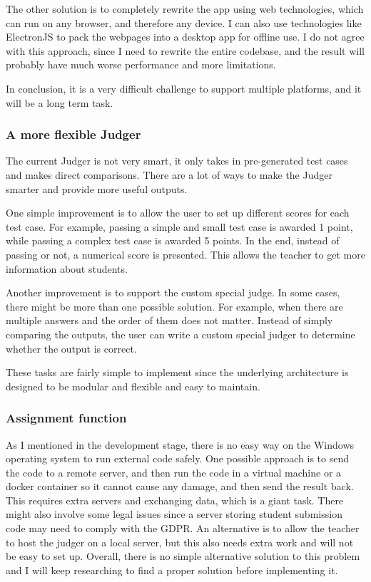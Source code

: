 \documentclass[report.tex]{subfiles}
\begin{document}
The other solution is to completely rewrite the app using web technologies, which can run on any browser, and therefore any device. I can also use technologies like ElectronJS\cite{electron} to pack the webpages into a desktop app for offline use. I do not agree with this approach, since I need to rewrite the entire codebase, and the result will probably have much worse performance and more limitations.

In conclusion, it is a very difficult challenge to support multiple platforms, and it will be a long term task.

\subsubsection{A more flexible Judger}

The current Judger is not very smart, it only takes in pre-generated test cases and makes direct comparisons. There are a lot of ways to make the Judger smarter and provide more useful outputs.

One simple improvement is to allow the user to set up different scores for each test case. For example, passing a simple and small test case is awarded 1 point, while passing a complex test case is awarded 5 points. In the end, instead of passing or not, a numerical score is presented. This allows the teacher to get more information about students.

Another improvement is to support the custom special judge. In some cases, there might be more than one possible solution. For example, when there are multiple answers and the order of them does not matter. Instead of simply comparing the outputs, the user can write a custom special judger to determine whether the output is correct.

These tasks are fairly simple to implement since the underlying architecture is designed to be modular and flexible and easy to maintain.

\subsubsection{Assignment function}

As I mentioned in the development stage, there is no easy way on the Windows operating system to run external code safely. One possible approach is to send the code to a remote server, and then run the code in a virtual machine or a docker container so it cannot cause any damage, and then send the result back. This requires extra servers and exchanging data, which is a giant task. There might also involve some legal issues since a server storing student submission code may need to comply with the GDPR. An alternative is to allow the teacher to host the judger on a local server, but this also needs extra work and will not be easy to set up. Overall, there is no simple alternative solution to this problem and I will keep researching to find a proper solution before implementing it.
\end{document}
